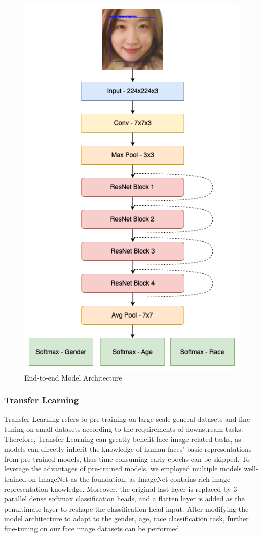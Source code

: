 \documentclass[DIV=calc, paper=a4, fontsize=10pt, twocolumn]{article}
\begin{document}
	\begin{figure}[t]
	\centering
	\includegraphics[width=0.9\linewidth]{imgs/original}
	\caption{End-to-end Model Architecture}
	\label{fig:end-to-end}
	\end{figure}
	
	\subsubsection{Transfer Learning}
	Transfer Learning refers to pre-training on large-scale general datasets and fine-tuning on small datasets according to the requirements of downstream tasks. Therefore, Transfer Learning can greatly benefit face image related tasks, as models can directly inherit the knowledge of human faces' basic representations from pre-trained models, thus time-consuming early epochs can be skipped. To leverage the advantages of pre-trained models, we employed multiple models well-trained on ImageNet as the foundation, as ImageNet contains rich image representation knowledge. Moreover, the original last layer is replaced by 3 parallel dense softmax classification heads, and a flatten layer is added as the penultimate layer to reshape the classification head input. After modifying the model architecture to adapt to the gender, age, race classification task, further fine-tuning on our face image datasets can be performed.
	
\end{document}
